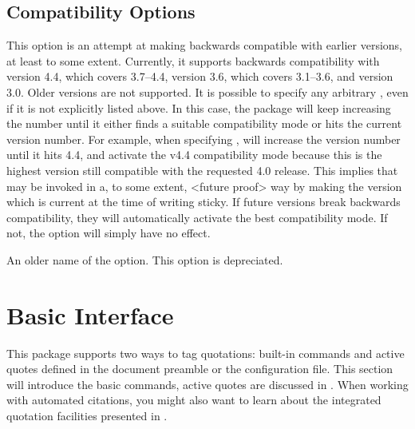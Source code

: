 \documentclass{ltxdockit}[2010/09/26]
\begin{document}
\subsection{Compatibility Options}
\label{opt:leg}

\begin{optionlist}


This option is an attempt at making  backwards compatible with earlier versions, at least to some extent. Currently, it supports backwards compatibility with version 4.4, which covers 3.7--4.4, version 3.6, which covers 3.1--3.6, and version 3.0. Older versions are not supported. It is possible to specify any arbitrary , even if it is not explicitly listed above. In this case, the package will keep increasing the  number until it either finds a suitable compatibility mode or hits the current version number. For example, when specifying ,  will increase the version number until it hits 4.4, and activate the v4.4 compatibility mode because this is the highest version still compatible with the requested 4.0 release. This implies that  may be invoked in a, to some extent, <future proof> way by making the version which is current at the time of writing sticky. If future versions break backwards compatibility, they will automatically activate the best compatibility mode. If not, the  option will simply have no effect.


An older name of the  option. This option is depreciated.

\end{optionlist}

\section{Basic Interface}
\label{bas}

This package supports two ways to tag quotations: built-in commands and active quotes defined in the document preamble or the configuration file. This section will introduce the basic commands, active quotes are discussed in . When working with automated citations, you might also want to learn about the integrated quotation facilities presented in .
\end{document}
